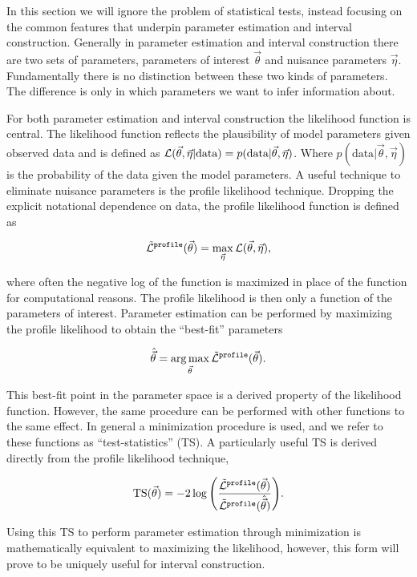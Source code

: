 In this section we will ignore the problem of statistical tests, instead focusing on the common features that underpin parameter estimation and interval construction.
Generally in parameter estimation and interval construction there are two sets of parameters, parameters of interest $\vec\theta$ and nuisance parameters $\vec\eta$.
Fundamentally there is no distinction between these two kinds of parameters.
The difference is only in which parameters we want to infer information about.

For both parameter estimation and interval construction the likelihood function is central.
The likelihood function reflects the plausibility of model parameters given observed data and is defined as $\mathcal{L}(\vec\theta, \vec\eta|\textrm{data}) = p(\textrm{data}|\vec\theta, \vec\eta)$.
Where $p(\textrm{data}|\vec\theta, \vec\eta)$ is the probability of the data given the model parameters.
A useful technique to eliminate nuisance parameters is the profile likelihood technique.
Dropping the explicit notational dependence on data, the profile likelihood function is defined as
\begin{linenomath*}
	\begin{equation}
	\tilde{\mathcal{L}}^\texttt{profile}(\vec\theta) = \max_{\vec\eta} \mathcal{L}(\vec\theta,\vec\eta),
	\label{eq:likelihood_profile}
	\end{equation}
\end{linenomath*}
where often the negative log of the function is maximized in place of the function for computational reasons.
The profile likelihood is then only a function of the parameters of interest.
Parameter estimation can be performed by maximizing the profile likelihood to obtain the ``best-fit'' parameters
\begin{linenomath*}
	\begin{equation}
	\hat{\vec\theta} = \operatorname*{arg\,max}_{\vec\theta} \tilde{\mathcal{L}}^\texttt{profile}(\vec\theta).
	\label{eq:best_fit}
	\end{equation}
\end{linenomath*}
This best-fit point in the parameter space is a derived property of the likelihood function.
However, the same procedure can be performed with other functions to the same effect.
In general a minimization procedure is used, and we refer to these functions as ``test-statistics'' (TS).
A particularly useful TS is derived directly from the profile likelihood technique,
\begin{linenomath*}
	\begin{equation}
	\mathrm{TS}(\vec\theta) = -2\log{\left(\frac{\tilde{\mathcal{L}}^\texttt{profile}(\vec\theta)}{\tilde{\mathcal{L}}^\texttt{profile}(\hat{\vec\theta})}\right)}.
	\end{equation}
\end{linenomath*}
Using this TS to perform parameter estimation through minimization is mathematically equivalent to maximizing the likelihood, however, this form will prove to be uniquely useful for interval construction.

